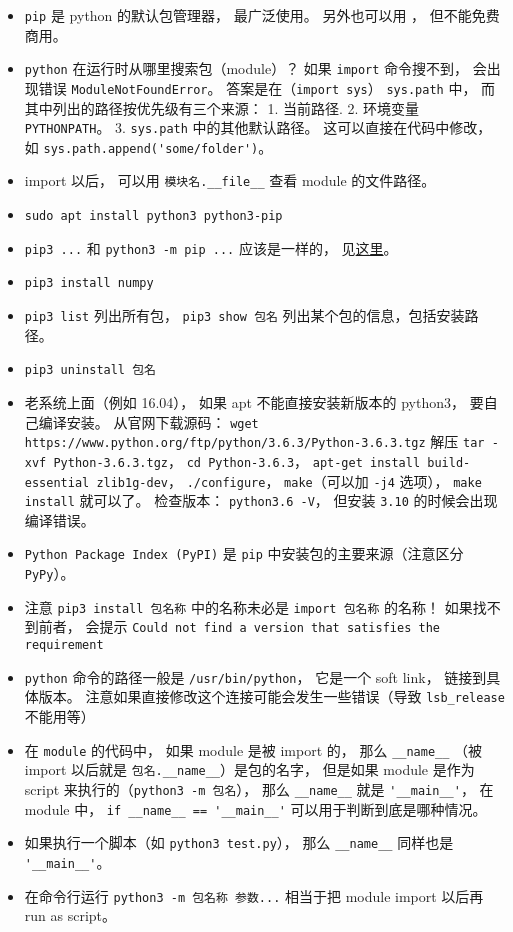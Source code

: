 

\begin{itemize}
\item \verb`pip` 是 python 的默认包管理器， 最广泛使用。 另外也可以用 ， 但不能免费商用。
\item \verb`python` 在运行时从哪里搜索包（module）？ 如果 \verb`import` 命令搜不到， 会出现错误 \verb`ModuleNotFoundError`。 答案是在（\verb`import sys`） \verb`sys.path` 中， 而其中列出的路径按优先级有三个来源： 1. 当前路径. 2. 环境变量 \verb`PYTHONPATH`。 3. \verb`sys.path` 中的其他默认路径。 这可以直接在代码中修改， 如 \verb`sys.path.append('some/folder')`。
\item import 以后， 可以用 \verb`模块名.__file__` 查看 module 的文件路径。
\item \verb`sudo apt install python3 python3-pip`
\item \verb`pip3 ...` 和 \verb`python3 -m pip ...` 应该是一样的， 见\href{https://stackoverflow.com/questions/41307101/difference-between-pip3-and-python3-m-pip}{这里}。
\item \verb`pip3 install numpy`
\item \verb`pip3 list` 列出所有包， \verb`pip3 show 包名` 列出某个包的信息，包括安装路径。
\item \verb`pip3 uninstall 包名`
\item 老系统上面（例如 16.04）， 如果 apt 不能直接安装新版本的 python3， 要自己编译安装。 从官网下载源码： \verb`wget https://www.python.org/ftp/python/3.6.3/Python-3.6.3.tgz` 解压 \verb`tar -xvf Python-3.6.3.tgz`， \verb`cd Python-3.6.3`， \verb`apt-get install build-essential zlib1g-dev`， \verb`./configure`， \verb`make`（可以加 \verb`-j4` 选项）， \verb`make install` 就可以了。 检查版本： \verb`python3.6 -V`， 但安装 \verb`3.10` 的时候会出现编译错误。
\item \verb`Python Package Index (PyPI)` 是 \verb`pip` 中安装包的主要来源（注意区分 \verb`PyPy`）。
\item 注意 \verb`pip3 install 包名称` 中的名称未必是 \verb`import 包名称` 的名称！ 如果找不到前者， 会提示 \verb`Could not find a version that satisfies the requirement`
\item \verb`python` 命令的路径一般是 \verb`/usr/bin/python`， 它是一个 soft link， 链接到具体版本。 注意如果直接修改这个连接可能会发生一些错误（导致 \verb`lsb_release` 不能用等）
\item 在 \verb`module` 的代码中， 如果 module 是被 import 的， 那么 \verb`__name__` （被 import 以后就是 \verb`包名.__name__`）是包的名字， 但是如果 module 是作为 script 来执行的（\verb`python3 -m 包名`）， 那么 \verb`__name__` 就是 \verb`'__main__'`， 在 module 中， \verb`if __name__ == '__main__'` 可以用于判断到底是哪种情况。
\item 如果执行一个脚本（如 \verb`python3 test.py`）， 那么 \verb`__name__` 同样也是 \verb`'__main__'`。
\item 在命令行运行 \verb`python3 -m 包名称 参数...` 相当于把 module import 以后再 run as script。
\end{itemize}


